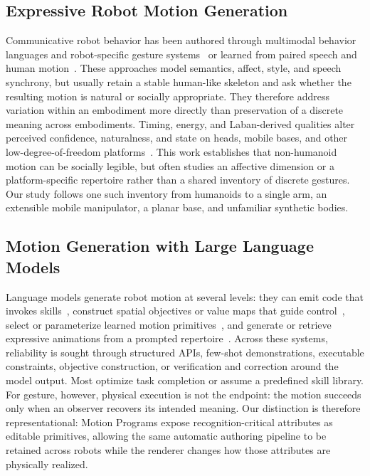 \documentclass[letterpaper,10pt,conference]{ieeeconf}
\begin{document}
\subsection{Expressive Robot Motion Generation}
Communicative robot behavior has been authored through multimodal behavior languages and robot-specific gesture systems~\cite{kopp2006bml,salem2012gesture,chidambaram2012gesture} or learned from paired speech and human motion~\cite{kucherenko2020gesticulator,yoon2020trimodal,liu2022beat}.
These approaches model semantics, affect, style, and speech synchrony, but usually retain a stable human-like skeleton and ask whether the resulting motion is natural or socially appropriate.
They therefore address variation within an embodiment more directly than preservation of a discrete meaning across embodiments.
Timing, energy, and Laban-derived qualities alter perceived confidence, naturalness, and state on heads, mobile bases, and other low-degree-of-freedom platforms~\cite{zhou2017timing,knight2014xytheta,knight2016laban}.
This work establishes that non-humanoid motion can be socially legible, but often studies an affective dimension or a platform-specific repertoire rather than a shared inventory of discrete gestures.
Our study follows one such inventory from humanoids to a single arm, an extensible mobile manipulator, a planar base, and unfamiliar synthetic bodies.

\subsection{Motion Generation with Large Language Models}
Language models generate robot motion at several levels: they can emit code that invokes skills~\cite{liang2023cap}, construct spatial objectives or value maps that guide control~\cite{huang2023voxposer}, select or parameterize learned motion primitives~\cite{dai2026lmp}, and generate or retrieve expressive animations from a prompted repertoire~\cite{mahadevan2024generative}.
Across these systems, reliability is sought through structured APIs, few-shot demonstrations, executable constraints, objective construction, or verification and correction around the model output.
Most optimize task completion or assume a predefined skill library.
For gesture, however, physical execution is not the endpoint: the motion succeeds only when an observer recovers its intended meaning.
Our distinction is therefore representational: Motion Programs expose recognition-critical attributes as editable primitives, allowing the same automatic authoring pipeline to be retained across robots while the renderer changes how those attributes are physically realized.
\end{document}
